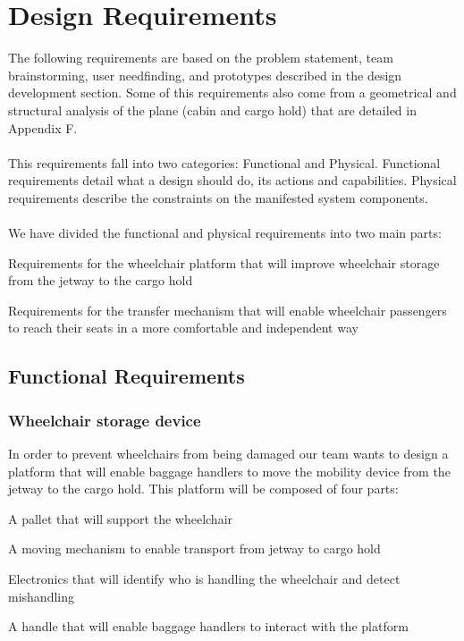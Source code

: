 \chapter{Design Requirements}

The following requirements are based on the problem statement, team brainstorming, user needfinding, and prototypes described in the design development section. Some of this requirements also come from a geometrical and structural analysis of the plane (cabin and cargo hold) that are detailed in Appendix F.
\\
\\This requirements fall into two categories: Functional and Physical. Functional requirements detail what a design should do, its actions and capabilities. Physical requirements describe the constraints on the manifested system components. 
\\
\\ We have divided the functional and physical requirements into two main parts:
\begin{list}{-}{}
  \item Requirements for the wheelchair platform that will improve wheelchair storage from the jetway to the cargo hold
  \item Requirements for the transfer mechanism that will enable wheelchair passengers to reach their seats in a more comfortable and independent way
\end{list} 

\section{Functional Requirements}

\subsection*{Wheelchair storage device}

In order to prevent wheelchairs from being damaged our team wants to design a platform that will enable baggage handlers to move the mobility device from the jetway to the cargo hold. This platform will be composed of four parts:

\begin{list}{-}{}
  \item A pallet that will support the wheelchair
  \item A moving mechanism to enable transport from jetway to cargo hold
  \item Electronics that will identify who is handling the wheelchair and detect mishandling
  \item A handle that will enable baggage handlers to interact with the platform
\end{list}

